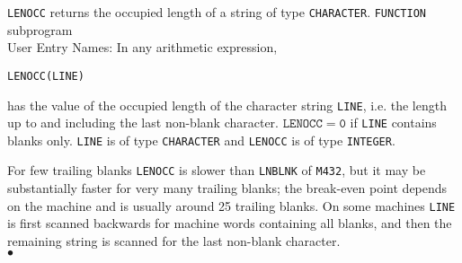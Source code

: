                                  
                  
\Submitter{}                                     
                   
{\tt LENOCC} returns the occupied length of a string of type
{\tt CHARACTER}.
\Structure
{\tt FUNCTION} subprogram \\
User Entry Names: 
\Usage
In any arithmetic expression,
\begin{center}
{\tt LENOCC(LINE)}
\end{center}
has the value of the occupied length of the character string {\tt LINE},
i.e. the length up to and including the last non-blank character.
$\mathtt{LENOCC = 0}$ if {\tt LINE} contains blanks only.
{\tt LINE} is of type {\tt CHARACTER} and {\tt LENOCC} is of type
{\tt INTEGER}.
 
For few trailing blanks {\tt LENOCC} is slower than
{\tt LNBLNK} of {\tt M432},
but it may be substantially faster for very many trailing blanks;
the break-even point depends on the machine and is usually
around 25 trailing blanks.
\Method
On some machines {\tt LINE} is first scanned backwards
for machine words containing all blanks,
and then the remaining string is scanned for the
last non-blank character.
\\ $\bullet$
